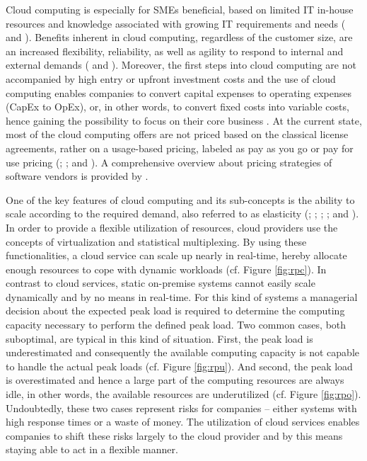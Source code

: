 Cloud computing is especially for \acp{SME} beneficial, based on limited IT in-house resources and knowledge associated with growing IT requirements and needs (\citealp[p. 398]{Weinhardt2009} and \citealp{Karabek2011}). Benefits inherent in cloud computing, regardless of the customer size, are an increased flexibility, reliability, as well as agility to respond to internal and external demands (\citealp[p. 51]{Vaquero2009} and \citealp[p. 129]{Iyer2010}). Moreover, the first steps into cloud computing are not accompanied by high entry or upfront investment costs and the use of cloud computing enables companies to convert capital expenses to operating expenses (CapEx to OpEx), or, in other words, to convert fixed costs into variable costs, hence gaining the possibility to focus on their core business \citep[pp. 51-53]{Armbrust2010}. At the current state, most of the cloud computing offers are not priced based on the classical license agreements, rather on a usage-based pricing, labeled as pay as you go or pay for use pricing (\citealp[pp. 50-54]{Vaquero2009}; \citealp[pp. 51-53,58]{Armbrust2010}; and \citealp[p. 2]{Iyer2010}). A comprehensive overview about pricing strategies of software vendors is provided by \citet{Lehmann2009}.

One of the key features of cloud computing and its sub-concepts is the ability to scale according to the required demand, also referred to as elasticity (\citealp[p. 4]{Foster2008}; \citealp[pp. 52-54]{Armbrust2010}; \citealp[p. 126]{Iyer2010}; \citealp[pp. 9-10]{Zhang2010}; and \citealp[p. 2]{Mell2011}). In order to provide a flexible utilization of resources, cloud providers use the concepts of virtualization and statistical multiplexing. By using these functionalities, a cloud service can scale up nearly in real-time, hereby allocate enough resources to cope with dynamic workloads (cf. Figure \ref{fig:rpc}). In contrast to cloud services, static on-premise systems cannot easily scale dynamically and by no means in real-time. For this kind of systems a managerial decision about the expected peak load is required to determine the computing capacity necessary to perform the defined peak load. Two common cases, both suboptimal, are typical in this kind of situation. First, the peak load is underestimated and consequently the available computing capacity is not capable to handle the actual peak loads (cf. Figure \ref{fig:rpu}). And second, the peak load is overestimated and hence a large part of the computing resources are always idle, in other words, the available resources are underutilized (cf. Figure \ref{fig:rpo}). Undoubtedly, these two cases represent risks for companies -- either systems with high response times or a waste of money. The utilization of cloud services enables companies to shift these risks largely to the cloud provider and by this means staying able to act in a flexible manner.

